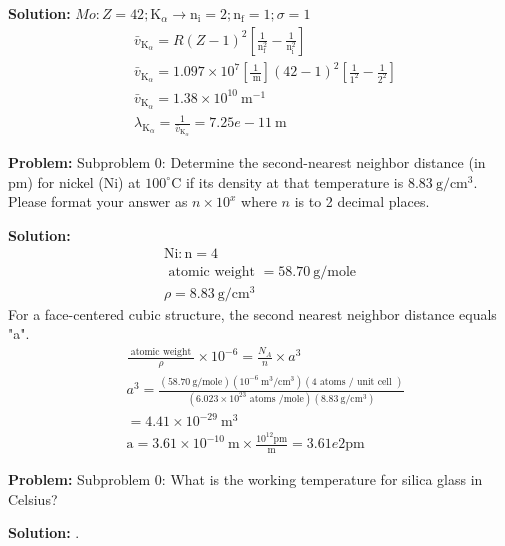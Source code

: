 \documentclass[10pt]{article}
\begin{document}
\textbf{Solution:}
$M o: Z=42 ; \mathrm{K}_{\alpha} \rightarrow \mathrm{n}_{\mathrm{i}}=2 ; \mathrm{n}_{\mathrm{f}}=1 ; \sigma=1$
\[
\begin{aligned}
&\bar{v}_{\mathrm{K}_{\alpha}}=R(Z-1)^{2}\left[\frac{1}{\mathrm{n}_{\mathrm{f}}^{2}}-\frac{1}{\mathrm{n}_{\mathrm{i}}^{2}}\right] \\
&\bar{v}_{\mathrm{K}_{\alpha}}=1.097 \times 10^{7}\left[\frac{1}{\mathrm{~m}}\right](42-1)^{2}\left[\frac{1}{1^{2}}-\frac{1}{2^{2}}\right] \\
&\bar{v}_{\mathrm{K}_{\alpha}}=1.38 \times 10^{10} \mathrm{~m}^{-1} \\
&\lambda_{\mathrm{K}_{\alpha}}=\frac{1}{\bar{v}_{\mathrm{K}_{\alpha}}}= \boxed{7.25e-11} \mathrm{~m}
\end{aligned}
\]


\textbf{Problem:}
Subproblem 0: Determine the second-nearest neighbor distance (in pm) for nickel (Ni) at $100^{\circ} \mathrm{C}$ if its density at that temperature is $8.83 \mathrm{~g} / \mathrm{cm}^{3}$. Please format your answer as $n \times 10^x$ where $n$ is to 2 decimal places.


\textbf{Solution:}
\[
\begin{array}{ll}
\mathrm{Ni}: \mathrm{n}=4 \\
\text { atomic weight }=58.70 \mathrm{~g} / \mathrm{mole} \\
\rho=8.83 \mathrm{~g} / \mathrm{cm}^{3}
\end{array}
\]
For a face-centered cubic structure, the second nearest neighbor distance equals "a".
\[
\begin{aligned}
& \frac{\text { atomic weight }}{\rho} \times 10^{-6}=\frac{N_{A}}{n} \times a^{3} \\
& a^{3}=\frac{(58.70 \mathrm{~g} / \mathrm{mole})\left(10^{-6} \mathrm{~m}^{3} / \mathrm{cm}^{3}\right)(4 \text { atoms } / \text { unit cell })}{\left(6.023 \times 10^{23} \text { atoms } / \mathrm{mole}\right)\left(8.83 \mathrm{~g} / \mathrm{cm}^{3}\right)} \\
& =4.41 \times 10^{-29} \mathrm{~m}^{3} \\
& \mathrm{a}=3.61 \times 10^{-10} \mathrm{~m} \times \frac{10^{12} \mathrm{pm}}{\mathrm{m}}= \boxed{3.61e2} \mathrm{pm} 
\end{aligned}
\]


\textbf{Problem:}
Subproblem 0: What is the working temperature for silica glass in Celsius?


\textbf{Solution:}
.
\end{document}
